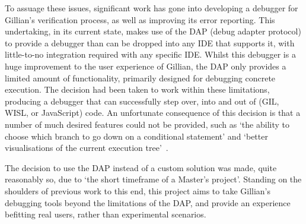 To assuage these issues, significant work has gone into developing a debugger
for Gillian's verification process, as well as improving its error reporting.
This undertaking, in its current state, makes use of the DAP (debug adapter protocol) 
to provide a debugger than can be dropped into any IDE that supports it, with little-to-no
integration required with any specific IDE. Whilst this debugger is a huge
improvement to the user experience of Gillian, the DAP only provides a limited
amount of functionality, primarily designed for debugging concrete execution.
The decision had been taken to work within these limitations, producing a
debugger that can successfully step over, into and out of (GIL, WISL, or
JavaScript) code. An unfortunate consequence of this decision is that a number
of much desired features could not be provided, such as `the ability to choose
which branch to go down on a conditional statement' and `better visualisations
of the current execution tree'~\cite[p.~49]{gillian-debugging-2021}.

The decision to use the DAP instead of a custom solution was made, quite
reasonably so, due to `the short timeframe of a Master's project'. Standing on
the shoulders of previous work to this end, this project aims to take Gillian's
debugging tools beyond the limitations of the DAP, and provide an experience
befitting real users, rather than experimental scenarios. 
